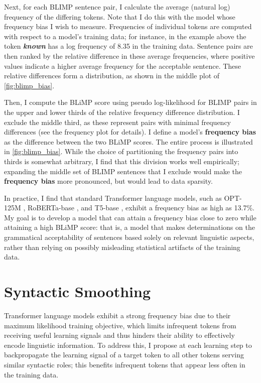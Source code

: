 Next, for each BLIMP sentence pair, I calculate the average (natural log) frequency of the differing tokens. Note that I do this with the model whose frequency bias I wish to measure. Frequencies of individual tokens are computed with respect to a model's training data; for instance, in the example above the token \textit{\textbf{known}} has a log frequency of 8.35 in the training data. Sentence pairs are then ranked by the relative difference in these average frequencies, where positive values indicate a higher average frequency for the acceptable sentence. These relative differences form a distribution, as shown in the middle plot of \cref{fig:blimp_bias}. 

Then, I compute the BLiMP score using pseudo log-likelihood \citep{salazar2020masked} for BLIMP pairs in the upper and lower thirds of the relative frequency difference distribution. I exclude the middle third, as these represent pairs with minimal frequency differences (see the frequency plot for details). I define a model's \textbf{frequency bias} as the difference between the two BLiMP scores. The entire process is illustrated in \cref{fig:blimp_bias}. While the choice of partitioning the frequency pairs into thirds is somewhat arbitrary, I find that this division works well empirically; expanding the middle set of BLIMP sentences that I exclude would make the \textbf{frequency bias} more pronounced, but would lead to data sparsity. 

In practice, I find that standard Transformer language models, such as OPT-125M \citep{zhang2022opt}, RoBERTa-base \citep{liu2019roberta}, and T5-base \citep{raffel2020t5}, exhibit a frequency bias as high as 13.7\%. My goal is to develop a model that can attain a frequency bias close to zero while attaining a high BLiMP score: that is, a model that makes determinations on the grammatical acceptability of sentences based solely on relevant linguistic aspects, rather than relying on possibly misleading statistical artifacts of the training data. 

\section{Syntactic Smoothing}
\label{sec:smoothing-method}

Transformer language models exhibit a strong frequency bias due to their maximum likelihood training objective, which limits infrequent tokens from receiving useful learning signals and thus hinders their ability to effectively encode linguistic information. To address this, I propose at each learning step to backpropagate the learning signal of a target token to all other tokens serving similar syntactic roles; this benefits infrequent tokens that appear less often in the training data.

